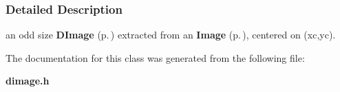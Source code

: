 \subsubsection{Detailed Description}
an odd size {\bf DImage} {\rm (p.\,\pageref{class_dimage})} extracted from an {\bf Image} {\rm (p.\,\pageref{class_image})}, centered on (xc,yc).



The documentation for this class was generated from the following file:\begin{CompactItemize}
\item 
{\bf dimage.h}\end{CompactItemize}
